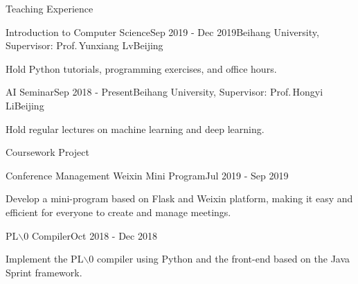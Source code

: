 \documentclass{resume} %
\begin{document}
\begin{rSection}{Teaching Experience}

\begin{rSubsection}{Introduction to Computer Science}{Sep 2019 - Dec 2019}{Beihang University, Supervisor: Prof.\,Yunxiang Lv}{Beijing}
\item Hold Python tutorials, programming exercises, and office hours.

\end{rSubsection}

\begin{rSubsection}{AI Seminar}{Sep 2018 - Present}{Beihang University, Supervisor: Prof.\,Hongyi Li}{Beijing}
\item Hold regular lectures on machine learning and deep learning.
\end{rSubsection}

\end{rSection}


\begin{rSection}{Coursework Project}

\begin{rSubsection}{Conference Management Weixin Mini Program}{Jul 2019 - Sep 2019}{}{}
\item Develop a mini-program based on Flask and Weixin platform, making it easy and efficient for everyone to create and manage meetings.
\end{rSubsection}


\begin{rSubsection}{PL$\backslash$0 Compiler}{Oct 2018 - Dec 2018}{}{}
\item Implement the PL$\backslash$0 compiler using Python and the front-end based on the Java Sprint framework.
\end{rSubsection}



\end{rSection}
\end{document}

